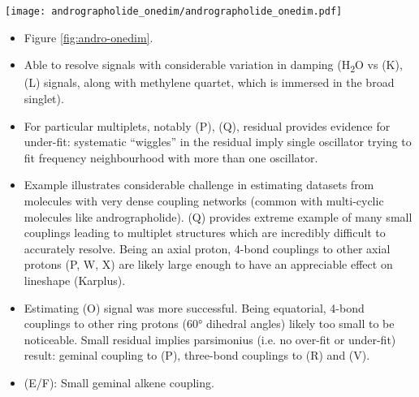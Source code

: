\begin{sidewaysfigure}
    \centering
    \texttt{[image: andrographolide\_onedim/andrographolide\_onedim.pdf]}
    \caption{
        Result of applying the estimation routine to a \ac{1D} dataset of andrographolide in \acs{DMSOd6}.
        \textbf{a.} Spectral data corresponding to the regions considered.
        \textbf{b.} The result of applying the \ac{MPM} to the regions, with
        the model order predicted with the \ac{MDL}. Blue/red lines: peaks of
        individual oscillators, grey line above: the model (sum of all
        oscillators), grep line below: the residual between the data and the model.
        \textbf{c.} The result after convergence of the \ac{NLP} routine, again
        with the model above and residual below.
        Red peaks in panel b correspond to oscillators which acquire negative
        amplitudes during the \ac{NLP} routine, and are subsequently purged.
        Note that one of the reasons estimated has been split in two in the
        figure to save space, with one half, featuring a signal from ethanol,
        being magnified.
    }
    \label{fig:andro-onedim}
\end{sidewaysfigure}
\begin{itemize}
    \item Figure \ref{fig:andro-onedim}.
    \item Able to resolve signals with considerable variation in damping
        (H\textsubscript{2}O vs (K), (L) signals, along with methylene quartet,
        which is immersed in the broad singlet).
    \item For particular multiplets, notably (P), (Q), residual provides
        evidence for under-fit: systematic ``wiggles'' in the residual imply
        single oscillator trying to fit frequency neighbourhood with more than
        one oscillator.
    \item Example illustrates considerable challenge in estimating datasets
        from molecules with very dense coupling networks (common with
        multi-cyclic molecules like andrographolide). (Q) provides extreme
        example of many small couplings leading to multiplet structures which
        are incredibly difficult to accurately resolve. Being an axial proton,
        4-bond couplings to other axial protons (P, W, X) are likely large
        enough to have an appreciable effect on lineshape (Karplus).
    \item Estimating (O) signal was more successful. Being equatorial, 4-bond
        couplings to other ring protons (\ang{60} dihedral angles) likely too
        small to be noticeable. Small residual implies parsimonius (i.e. no
        over-fit or under-fit) result: geminal coupling to (P), three-bond
        couplings to (R) and (V).
    \item (E/F): Small geminal alkene coupling.
\end{itemize}


